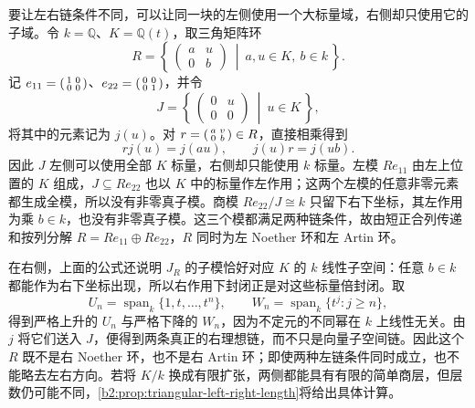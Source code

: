 要让左右链条件不同，可以让同一块的左侧使用一个大标量域，右侧却只使用它的子域。令 \(k=\mathbb Q\)、\(K=\mathbb Q(t)\)，取三角矩阵环
\[
	R=\left\{\,
	\begin{pmatrix}a&u\\0&b\end{pmatrix}
	\ \middle|\ a,u\in K,\ b\in k \,\right\}.
\]
记 \(e_{11}=\begin{psmallmatrix}1&0\\0&0\end{psmallmatrix}\)、\(e_{22}=\begin{psmallmatrix}0&0\\0&1\end{psmallmatrix}\)，并令
\[
	J=\left\{\,
	\begin{pmatrix}0&u\\0&0\end{pmatrix}\ \middle|\ u\in K
	\,\right\},
\]
将其中的元素记为 \(j(u)\)。对 \(r=\begin{psmallmatrix}a&v\\0&b\end{psmallmatrix}\in R\)，直接相乘得到
\[
	rj(u)=j(au),\qquad j(u)r=j(ub).
\]
因此 \(J\) 左侧可以使用全部 \(K\) 标量，右侧却只能使用 \(k\) 标量。左模 \(Re_{11}\) 由左上位置的 \(K\) 组成，\(J\subseteq Re_{22}\) 也以 \(K\) 中的标量作左作用；这两个左模的任意非零元素都生成全模，所以没有非零真子模。商模 \(Re_{22}/J\cong k\) 只留下右下坐标，其左作用为乘 \(b\in k\)，也没有非零真子模。这三个模都满足两种链条件，故由短正合列传递和按列分解 \(R=Re_{11}\oplus Re_{22}\)，\(R\) 同时为左 Noether 环和左 Artin 环。

\ProseParagraphBreak
在右侧，上面的公式还说明 \(J_R\) 的子模恰好对应 \(K\) 的 \(k\) 线性子空间：任意 \(b\in k\) 都能作为右下坐标出现，所以右作用下封闭正是对这些标量倍封闭。取
\[
	U_n=\operatorname{span}_k\{1,t,\ldots,t^n\},\qquad W_n=\operatorname{span}_k\{t^j:j\ge n\},
\]
得到严格上升的 \(U_n\) 与严格下降的 \(W_n\)，因为不定元的不同幂在 \(k\) 上线性无关。由 \(j\) 将它们送入 \(J\)，便得到两条真正的右理想链，而不只是向量子空间链。因此这个 \(R\) 既不是右 Noether 环，也不是右 Artin 环；即使两种左链条件同时成立，也不能略去左右方向。若将 \(K/k\) 换成有限扩张，两侧都能具有有限的简单商层，但层数仍可能不同，\cref{b2:prop:triangular-left-right-length}将给出具体计算。
